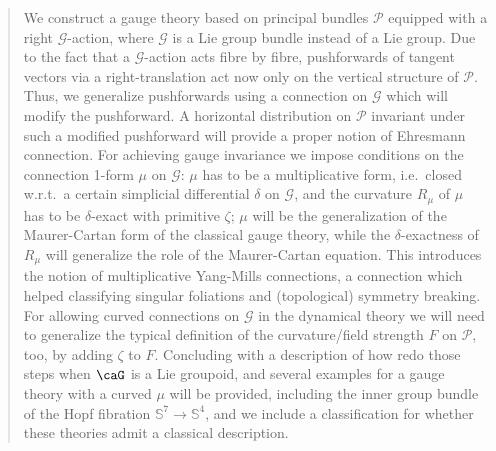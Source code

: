 \documentclass[reqno,a4paper,oneside]{amsart}
\theoremstyle{plain}
\theoremstyle{remark}
\theoremstyle{definition}
\begin{document}
\begin{titlepage}
        \begin{quote}
				We construct a gauge theory based on principal bundles $\mathcal{P}$ equipped with a right $\mathcal{G}$-action, where $\mathcal{G}$ is a Lie group bundle instead of a Lie group. Due to the fact that a $\mathcal{G}$-action acts fibre by fibre, pushforwards of tangent vectors via a right-translation act now only on the vertical structure of $\mathcal{P}$. Thus, we generalize pushforwards using a connection on $\mathcal{G}$ which will modify the pushforward. A horizontal distribution on $\mathcal{P}$ invariant under such a modified pushforward will provide a proper notion of Ehresmann connection. For achieving gauge invariance we impose conditions on the connection 1-form $\mu$ on $\mathcal{G}$: $\mu$ has to be a multiplicative form, i.e.\ closed w.r.t.\ a certain simplicial differential $\delta$ on $\mathcal{G}$, and the curvature $R_\mu$ of $\mu$ has to be $\delta$-exact with primitive $\zeta$; $\mu$ will be the generalization of the Maurer-Cartan form of the classical gauge theory, while the $\delta$-exactness of $R_\mu$ will generalize the role of the Maurer-Cartan equation. This introduces the notion of multiplicative Yang-Mills connections, a connection which helped classifying singular foliations and (topological) symmetry breaking. For allowing curved connections on $\mathcal{G}$ in the dynamical theory we will need to generalize the typical definition of the curvature/field strength $F$ on $\mathcal{P}$, too, by adding $\zeta$ to $F$. Concluding with a description of how redo those steps when $\caG$ is a Lie groupoid, and several examples for a gauge theory with a curved $\mu$ will be provided, including the inner group bundle of the Hopf fibration $\mathbb{S}^7 \to \mathbb{S}^4$, and we include a classification for whether these theories admit a classical description. 
        \end{quote}
    \end{titlepage}





\tableofcontents




\renewcommand{\thefootnote}{\arabic{footnote}}
%
\setlength{\parindent}{12 pt}
\end{document}
